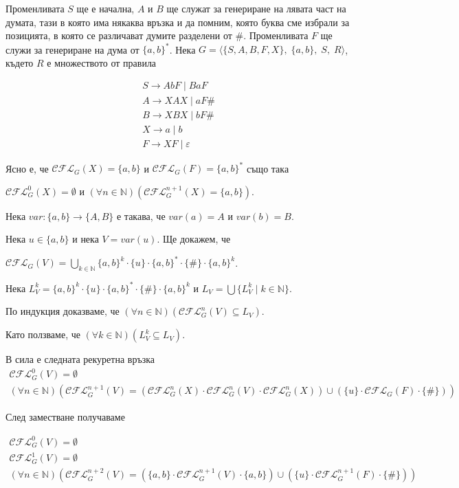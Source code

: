 \documentclass[12pt]{article}
\begin{document}
Променливата \(S\) ще е начална, \(A\) и \(B\) ще служат за генериране на лявата част на думата, тази в която има някаква връзка и да помним, която буква сме избрали за позицията, в която се различават думите разделени от \(\#\). Променливата \(F\) ще служи за генериране на дума от \(\{a, b\}^*\). Нека \(G = \langle \{S, A, B, F, X\},\; \{a, b\},\; S,\; R \rangle\), където \(R\) е множеството от правила

\begin{align*}
    S \to AbF \mid BaF \\
    A \to XAX \mid aF\# \\
    B \to XBX \mid bF\# \\
    X \to a \mid b \\
    F \to XF \mid \varepsilon
\end{align*}

Ясно е, че \(\mathcal{CFL}_G(X) = \{a, b\}\) и \(\mathcal{CFL}_G(F) = \{a, b\}^*\)
също така

\(\mathcal{CFL}_G^0(X) = \emptyset\) и \((\forall n \in \mathbb{N})(\mathcal{CFL}_G^{n + 1}(X) = \{a, b\})\).

Нека \(var : \{a, b\} \to \{A, B\} \) е такава, че \(var(a) = A\) и \(var(b) = B\).

Нека \(u \in \{a, b\}\) и нека \(V = var(u)\). Ще докажем, че

\(\mathcal{CFL}_G(V) = \displaystyle\bigcup_{k \in \mathbb{N}} \{a, b\}^k \cdot \{u\} \cdot \{a, b\}^* \cdot \{\#\} \cdot \{a, b\}^k\).

Нека \(L_V^k = \{a, b\}^k \cdot \{u\} \cdot \{a, b\}^* \cdot \{\#\} \cdot \{a, b\}^k\) и \(L_V = \bigcup \{L_V^k  \mid k \in \mathbb{N}\} \).

По индукция доказваме, че \((\forall n \in \mathbb{N})(\mathcal{CFL}_G^n(V) \subseteq L_V)\).

Като ползваме, че \((\forall k \in \mathbb{N})(L_V^k \subseteq L_V)\).

В сила е следната рекуретна връзка
\begin{align*}
    \mathcal{CFL}_G^0(V) = \emptyset \\
    (\forall n \in \mathbb N)(\mathcal{CFL}_G^{n + 1}(V) = (\mathcal{CFL}_G^n(X) \cdot \mathcal{CFL}_G^n(V) \cdot \mathcal{CFL}_G^n(X)) \cup (\{u\} \cdot \mathcal{CFL}_G(F) \cdot \{\#\}))
\end{align*}

След заместване получаваме

\begin{align*}
    \mathcal{CFL}_G^0(V) = \emptyset \\
    \mathcal{CFL}_G^1(V) = \emptyset \\
    (\forall n \in \mathbb N)(\mathcal{CFL}_G^{n + 2}(V) = (\{a, b\} \cdot \mathcal{CFL}_G^{n + 1}(V) \cdot \{a, b\}) \cup (\{u\} \cdot \mathcal{CFL}_G^{n + 1}(F) \cdot \{\#\}))
\end{align*}
\end{document}
